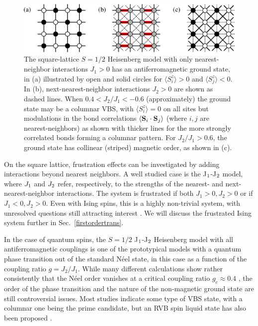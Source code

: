 \documentclass[draft,numberedheadings]{aipproc}
\begin{document}
\begin{figure}
\includegraphics[width=11.5cm, clip]{j1j2states.eps}
\caption{The square-lattice $S=1/2$ Heisenberg model with only nearest-neighbor interactions $J_1>0$ has an antiferromagnetic ground state, in (a) illustrated 
by open and solid circles for $\langle S^z_i\rangle>0$ and $\langle S^z_j\rangle<0$. In (b), next-nearest-neighbor 
interactions $J_2>0$ are shown as dashed lines. When $0.4 < J_2/J_1 < -0.6$ (approximately) the ground state may be a columnar VBS, with $\langle S^z_i\rangle=0$ 
on all sites but modulations in the bond correlations $\langle {\bf S}_i\cdot {\bf S}_j\rangle $ (where $i,j$ are nearest-neighbors) as shown with thicker lines 
for the more strongly correlated bonds forming a columnar pattern. For $J_2/J_1>0.6$, the ground state has collinear (striped) magnetic order, as shown in (c).}
\label{j1j2states}
\end{figure}

On the square lattice, frustration effects can be investigated by adding interactions beyond nearest neighbors. A well studied case is the J$_{\rm 1}$-J$_{\rm 2}$ 
model, where $J_{\rm 1}$ and $J_{\rm 2}$ refer, respectively, to the strengths of the nearest- and next-nearest-neighbor interactions. The system is frustrated if 
both $J_1>0,J_2>0$ or if $J_1<0,J_2>0$. Even with Ising spins, this is a highly non-trivial system, with unresolved questions still attracting interest 
\cite{yin,kalz,jin}. We will discuss the frustrated Ising system further in Sec.~\ref{firstordertrans}.

In the case of quantum spins, the $S=1/2$ J$_{\rm 1}$-J$_{\rm 2}$ Heisenberg model with all antiferromagnetic couplings is one of the prototypical 
models with a quantum phase transition out of the standard N\'eel state, in this case as a function of the coupling ratio $g=J_2/J_1$. While many different calculations 
show rather consistently that the N\'eel order vanishes at a critical coupling ratio $g_c \approx 0.4$ \cite{dagotto3,schulz1,singh,sushkov,kruger,beach1,isaev}, the 
order of the phase transition and the nature of the non-magnetic ground state are still controversial issues. Most studies indicate some type of VBS state, 
with a columnar one being the prime candidate, but an RVB spin liquid state has also been proposed \cite{capriotti}. 
\end{document}
